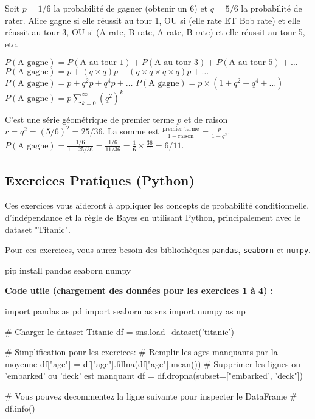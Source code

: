 \begin{correctionbox}
Soit $p=1/6$ la probabilité de gagner (obtenir un 6) et $q=5/6$ la probabilité de rater.
Alice gagne si elle réussit au tour 1, OU si (elle rate ET Bob rate) et elle réussit au tour 3, OU si (A rate, B rate, A rate, B rate) et elle réussit au tour 5, etc.

$P(\text{A gagne}) = P(\text{A au tour 1}) + P(\text{A au tour 3}) + P(\text{A au tour 5}) + \dots$
$P(\text{A gagne}) = p + (q \times q)p + (q \times q \times q \times q)p + \dots$
$P(\text{A gagne}) = p + q^2 p + q^4 p + \dots$
$P(\text{A gagne}) = p \times (1 + q^2 + q^4 + \dots)$
$P(\text{A gagne}) = p \sum_{k=0}^{\infty} (q^2)^k$

C'est une série géométrique de premier terme $p$ et de raison $r = q^2 = (5/6)^2 = 25/36$.
La somme est $\frac{\text{premier terme}}{1 - \text{raison}} = \frac{p}{1 - q^2}$.
$P(\text{A gagne}) = \frac{1/6}{1 - 25/36} = \frac{1/6}{11/36} = \frac{1}{6} \times \frac{36}{11} = 6/11$.
\end{correctionbox}

\subsection{Exercices Pratiques (Python)}

Ces exercices vous aideront à appliquer les concepts de probabilité conditionnelle, d'indépendance et la règle de Bayes en utilisant Python, principalement avec le dataset "Titanic".

Pour ces exercices, vous aurez besoin des bibliothèques \texttt{pandas}, \texttt{seaborn} et \texttt{numpy}.

\begin{codecell}
pip install pandas seaborn numpy
\end{codecell}

\textbf{Code utile (chargement des données pour les exercices 1 à 4) :}
\begin{codecell}
import pandas as pd
import seaborn as sns
import numpy as np

# Charger le dataset Titanic
df = sns.load_dataset('titanic')

# Simplification pour les exercices:
# Remplir les ages manquants par la moyenne
df["age"] = df["age"].fillna(df["age"].mean())
# Supprimer les lignes ou 'embarked' ou 'deck' est manquant
df = df.dropna(subset=["embarked', 'deck"])

# Vous pouvez decommentez la ligne suivante pour inspecter le DataFrame
# df.info()
\end{codecell}



